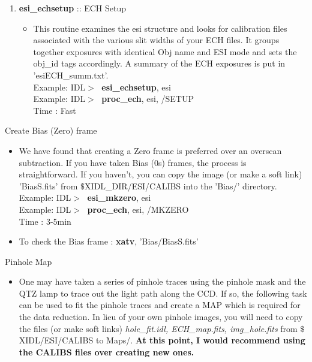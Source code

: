 \documentclass[11pt,letterpaper,dvips]{article}
\begin{document}
\begin{enumerate}
\begin{enumerate}
    \item {\bf esi\_echsetup} :: ECH Setup
	\begin{itemize}
	  \item This routine examines the esi structure and looks for calibration
	files associated with the various slit widths of your ECH files.  
	It groups together exposures with identical Obj name and ESI mode and
	sets the obj\_id tags accordingly.
	A summary of the ECH exposures is put in 'esiECH\_summ.txt'. \\
         \quad Example: IDL$> \;$ {\bf esi\_echsetup}, esi \\
         \quad Example: IDL$> \;$ {\bf proc\_ech}, esi, /SETUP \\
         \quad Time   : Fast
	\end{itemize}

  \end{enumerate}

{\Large    \item Create Bias (Zero) frame}
	\begin{itemize}
	  \item We have found that creating a Zero frame is preferred
	over an overscan subtraction.  If you have taken Bias (0s) frames,
	the process is straightforward.  If you haven't, you can copy the image
	(or make a soft link) 'BiasS.fits' from 
	$\$$XIDL\_DIR/ESI/CALIBS into the 'Bias/' directory.\\
         \quad Example: IDL$> \;$ {\bf esi\_mkzero}, esi \\
         \quad Example: IDL$> \;$ {\bf proc\_ech}, esi, /MKZERO \\
         \quad Time   : 3-5min 
	  \item To check the Bias frame : {\bf xatv}, 'Bias/BiasS.fits'
	\end{itemize}

{\Large  \item Pinhole Map}
  \begin{itemize}
	\item One may have taken a series of pinhole traces using the
	pinhole mask and the QTZ lamp to trace out the light path along
	the CCD.  If so, the following task can be used to fit the pinhole
	traces and create a MAP which is required for the data reduction.
	In lieu of your own pinhole images, you will need to copy the files
	(or make soft links)
	{\it hole\_fit.idl, ECH\_map.fits, img\_hole.fits} from 
	$\$$XIDL/ESI/CALIBS to Maps/.  {\bf At this point, I would recommend
	using the CALIBS files over creating new ones.}
	

\end{itemize}
\end{enumerate}
\end{document}
